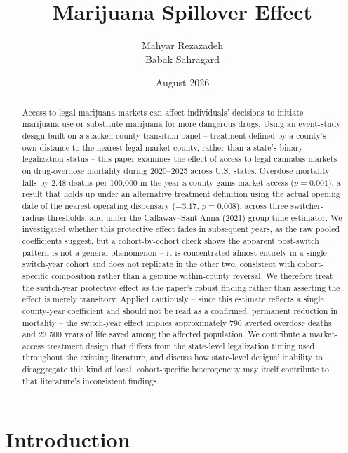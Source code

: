 \documentclass{article}
\title{Marijuana Spillover Effect}
\author{Mahyar Rezazadeh \\ Babak Sahragard}
\date{August 2026}
\begin{document}
\maketitle

\begin{abstract}
\noindent Access to legal marijuana markets can affect individuals' decisions to initiate marijuana use or
substitute marijuana for more dangerous drugs. Using an event-study design built on a stacked county-transition
panel -- treatment defined by a county's own distance to the nearest legal-market county, rather than a state's
binary legalization status -- this paper examines the effect of access to legal cannabis markets on drug-overdose
mortality during 2020--2025 across U.S. states. Overdose mortality falls by 2.48 deaths per 100{,}000 in the year a
county gains market access ($p=0.001$), a result that holds up under an alternative treatment definition using the
actual opening date of the nearest operating dispensary ($-3.17$, $p=0.008$), across three switcher-radius
thresholds, and under the Callaway--Sant'Anna (2021) group-time estimator. We investigated whether this protective
effect fades in subsequent years, as the raw pooled coefficients suggest, but a cohort-by-cohort check shows the
apparent post-switch pattern is not a general phenomenon -- it is concentrated almost entirely in a single
switch-year cohort and does not replicate in the other two, consistent with cohort-specific composition rather than
a genuine within-county reversal. We therefore treat the switch-year protective effect as the paper's robust
finding rather than asserting the effect is merely transitory. Applied cautiously -- since this estimate reflects a
single county-year coefficient and should not be read as a confirmed, permanent reduction in mortality -- the
switch-year effect implies approximately 790 averted overdose deaths and 23{,}500 years of life saved among the
affected population. We contribute a market-access treatment design that differs from the state-level legalization
timing used throughout the existing literature, and discuss how state-level designs' inability to disaggregate this
kind of local, cohort-specific heterogeneity may itself contribute to that literature's inconsistent findings.
\end{abstract}

\section{Introduction}
\end{document}
